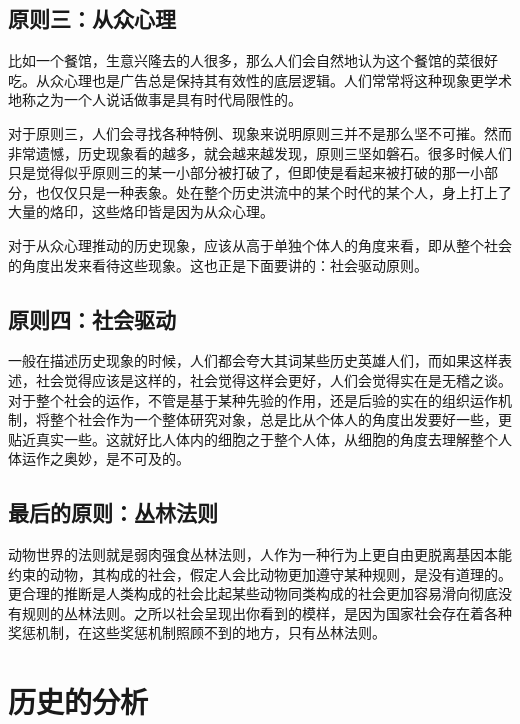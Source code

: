 \documentclass[12pt,oneside]{book}
\begin{document}
\section{原则三：从众心理}

比如一个餐馆，生意兴隆去的人很多，那么人们会自然地认为这个餐馆的菜很好吃。从众心理也是广告总是保持其有效性的底层逻辑。人们常常将这种现象更学术地称之为一个人说话做事是具有时代局限性的。

对于原则三，人们会寻找各种特例、现象来说明原则三并不是那么坚不可摧。然而非常遗憾，历史现象看的越多，就会越来越发现，原则三坚如磐石。很多时候人们只是觉得似乎原则三的某一小部分被打破了，但即使是看起来被打破的那一小部分，也仅仅只是一种表象。处在整个历史洪流中的某个时代的某个人，身上打上了大量的烙印，这些烙印皆是因为从众心理。

对于从众心理推动的历史现象，应该从高于单独个体人的角度来看，即从整个社会的角度出发来看待这些现象。这也正是下面要讲的：社会驱动原则。



\section{原则四：社会驱动}

一般在描述历史现象的时候，人们都会夸大其词某些历史英雄人们，而如果这样表述，社会觉得应该是这样的，社会觉得这样会更好，人们会觉得实在是无稽之谈。对于整个社会的运作，不管是基于某种先验的作用，还是后验的实在的组织运作机制，将整个社会作为一个整体研究对象，总是比从个体人的角度出发要好一些，更贴近真实一些。这就好比人体内的细胞之于整个人体，从细胞的角度去理解整个人体运作之奥妙，是不可及的。


\section{最后的原则：丛林法则}

动物世界的法则就是弱肉强食丛林法则，人作为一种行为上更自由更脱离基因本能约束的动物，其构成的社会，假定人会比动物更加遵守某种规则，是没有道理的。更合理的推断是人类构成的社会比起某些动物同类构成的社会更加容易滑向彻底没有规则的丛林法则。之所以社会呈现出你看到的模样，是因为国家社会存在着各种奖惩机制，在这些奖惩机制照顾不到的地方，只有丛林法则。


\chapter{历史的分析}
\end{document}
